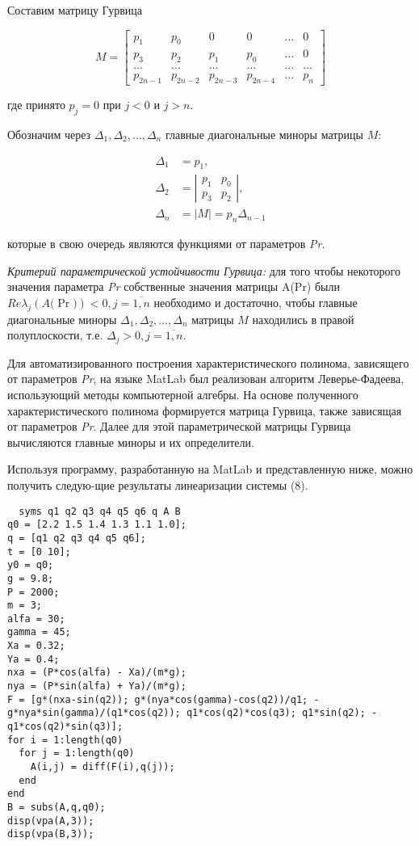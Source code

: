 Составим матрицу Гурвица

\begin{center}
  \[
  M = \begin{bmatrix} 
  p_{1} & p_{0} & 0 & 0 & \dots & 0 \\
  p_{3} & p_{2} & p_{1} & p_{0} & \dots & 0 \\
  \dots & \dots & \dots & \dots & \dots & \dots \\
  p_{2n-1} & p_{2n-2} & p_{2n-3} & p_{2n-4} & \dots & p_{n}
  \end{bmatrix}
  \]
  
\end{center}
где принято \({p}_{{j}}{= 0}\) при
\({j < 0}\) и \({j > n}\).

Обозначим через
\(\Delta_{1}, \Delta_{2}, \ldots, \Delta_{n}\)
главные диагональные миноры матрицы \(M\):

\[
\begin{array}{rl}
\Delta_{1} & = p_{1}, \\
\Delta_{2} & = \left| \begin{matrix}
p_{1} & p_{0} \\
p_{3} & p_{2}
\end{matrix} \right|, \\
\Delta_{n} & = \left| M \right| = p_{n} \Delta_{n-1}
\end{array}
\]


которые в свою очередь являются функциями от параметров \emph{Pr}.

\emph{Критерий параметрической устойчивости Гурвица:} для того чтобы
некоторого значения параметра \emph{Pr} собственные значения матрицы
A(Pr) были
\({Re}{\lambda}_{{j}}\left( {A(}{\Pr}{)} \right){< 0,j =}\overline{{1,n}}\)
необходимо и достаточно, чтобы главные диагональные миноры
\({\Delta}_{{1}}{,}{\Delta}_{{2}}{,...,}{\Delta}_{{n}}\)
матрицы \({M}\) находились в правой полуплоскости, т.е.
\({\Delta}_{{j}}{> 0,j =}\overline{{1,n}}\).


Для автоматизированного построения характеристического полинома,
зависящего от параметров \emph{Pr}, на языке MatLab был реализован
алгоритм Леверье-Фадеева, использующий методы компьютерной алгебры. На
основе полученного характеристического полинома формируется матрица
Гурвица, также зависящая от параметров \emph{Pr}. Далее для этой
параметрической матрицы Гурвица вычисляются главные миноры и их
определители.

Используя программу, разработанную на MatLab и представленную ниже,
можно получить следую-щие результаты линеаризации системы (8).
\begin{lstlisting}
  syms q1 q2 q3 q4 q5 q6 q A B
q0 = [2.2 1.5 1.4 1.3 1.1 1.0];
q = [q1 q2 q3 q4 q5 q6];
t = [0 10];   
y0 = q0;
g = 9.8; 
P = 2000; 
m = 3; 
alfa = 30; 
gamma = 45; 
Xa = 0.32; 
Ya = 0.4;
nxa = (P*cos(alfa) - Xa)/(m*g);  
nya = (P*sin(alfa) + Ya)/(m*g);
F = [g*(nxa-sin(q2)); g*(nya*cos(gamma)-cos(q2))/q1; -g*nya*sin(gamma)/(q1*cos(q2)); q1*cos(q2)*cos(q3); q1*sin(q2); -q1*cos(q2)*sin(q3)];
for i = 1:length(q0)
  for j = 1:length(q0)
    A(i,j) = diff(F(i),q(j));
  end
end
B = subs(A,q,q0);
disp(vpa(A,3));
disp(vpa(B,3));

\end{lstlisting}




